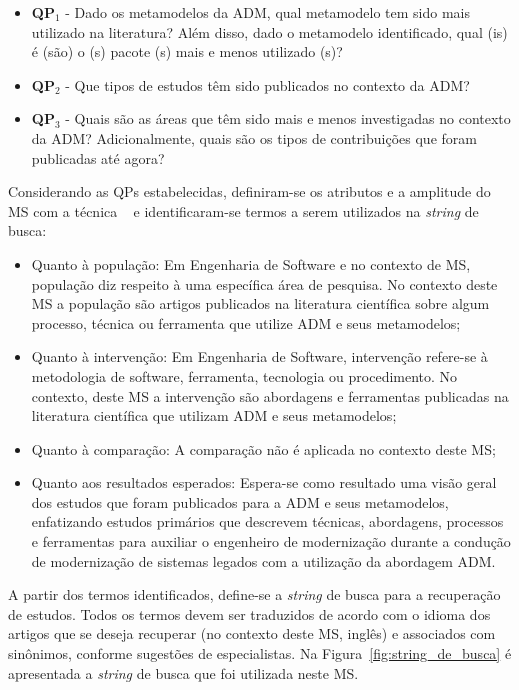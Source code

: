 \begin{itemize}
\item \textbf{QP$_1$} - Dado os metamodelos da ADM, qual metamodelo tem sido mais utilizado na literatura? Além disso, dado o metamodelo identificado, qual (is) é (são) o (s) pacote (s) mais e menos utilizado (s)?
\item \textbf{QP$_2$} - Que tipos de estudos têm sido publicados no contexto da ADM?
\item \textbf{QP$_3$} - Quais são as áreas que têm sido mais e menos investigadas no contexto da ADM? Adicionalmente, quais são os tipos de contribuições que foram publicadas até agora?
\end{itemize}

Considerando as QPs estabelecidas, definiram-se os atributos e a amplitude do MS com a técnica ~\cite{Kitchenham_2010} e identificaram-se termos a serem utilizados na \textit{string} de busca:

\begin{itemize}
\item Quanto à população: Em Engenharia de Software e no contexto de MS, população diz respeito à uma específica área de pesquisa. No contexto deste MS a população são artigos publicados na literatura científica sobre algum processo, técnica ou ferramenta que utilize ADM e seus metamodelos;

\item Quanto à intervenção: Em Engenharia de Software, intervenção refere-se à metodologia de software, ferramenta, tecnologia ou procedimento. No contexto, deste MS a intervenção são abordagens e ferramentas publicadas na literatura científica que utilizam ADM e seus metamodelos;

\item Quanto à comparação: A comparação não é aplicada no contexto deste MS;

\item Quanto aos resultados esperados: Espera-se como resultado uma visão geral dos estudos que foram publicados para a ADM e seus metamodelos, enfatizando estudos primários que descrevem técnicas, abordagens, processos e ferramentas para auxiliar o engenheiro de modernização durante a condução de modernização de sistemas legados com a utilização da abordagem ADM.

\end{itemize}

A partir dos termos identificados, define-se a \textit{string} de busca para a recuperação de estudos. Todos os termos devem ser traduzidos de acordo com o idioma dos artigos que se deseja recuperar (no contexto deste MS, inglês) e associados com sinônimos, conforme sugestões de especialistas. Na Figura~\ref{fig:string_de_busca} é apresentada a \textit{string} de busca que foi utilizada neste MS.

